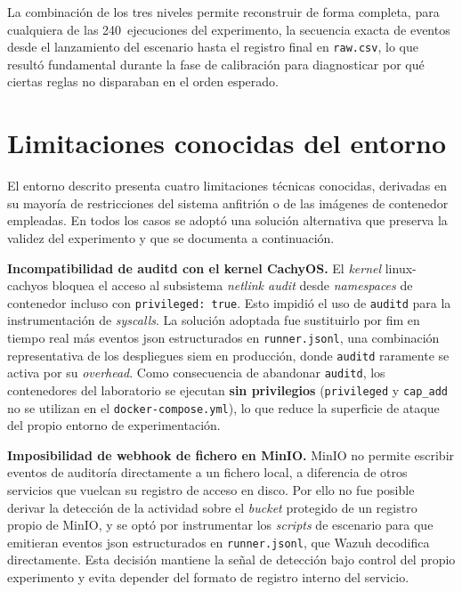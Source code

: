 \documentclass[../main.tex]{subfiles}
\begin{document}
La combinación de los tres niveles permite reconstruir de forma completa, para
cualquiera de las 240~ejecuciones del experimento, la secuencia exacta de
eventos desde el lanzamiento del escenario hasta el registro final en
\texttt{raw.csv}, lo que resultó fundamental durante la fase de calibración
para diagnosticar por qué ciertas reglas no disparaban en el orden esperado.

\section{Limitaciones conocidas del entorno}
\label{sec:limitaciones}

El entorno descrito presenta cuatro limitaciones técnicas conocidas,
derivadas en su mayoría de restricciones del sistema anfitrión o de las
imágenes de contenedor empleadas. En todos los casos se adoptó una solución
alternativa que preserva la validez del experimento y que se documenta a
continuación.

\textbf{Incompatibilidad de auditd con el kernel CachyOS.} El \emph{kernel}
linux-cachyos bloquea el acceso al subsistema \emph{netlink audit} desde
\emph{namespaces} de contenedor incluso con \texttt{privileged:~true}. Esto
impidió el uso de \texttt{auditd} para la instrumentación de \emph{syscalls}.
La solución adoptada fue sustituirlo por \gls{fim} en tiempo real más eventos
\gls{json} estructurados en \texttt{runner.jsonl}, una combinación
representativa de los despliegues \gls{siem} en producción, donde
\texttt{auditd} raramente se activa por su \emph{overhead}. Como consecuencia
de abandonar \texttt{auditd}, los contenedores del laboratorio se ejecutan
\textbf{sin privilegios} (\texttt{privileged} y \texttt{cap\_add} no se
utilizan en el \texttt{docker-compose.yml}), lo que reduce la superficie de
ataque del propio entorno de experimentación.

\textbf{Imposibilidad de webhook de fichero en MinIO.} MinIO no permite
escribir eventos de auditoría directamente a un fichero local, a diferencia
de otros servicios que vuelcan su registro de acceso en disco. Por ello no
fue posible derivar la detección de la actividad sobre el \emph{bucket}
protegido de un registro propio de MinIO, y se optó por instrumentar los
\emph{scripts} de escenario para que emitieran eventos \gls{json}
estructurados en \texttt{runner.jsonl}, que Wazuh decodifica directamente.
Esta decisión mantiene la señal de detección bajo control del propio
experimento y evita depender del formato de registro interno del servicio.
\end{document}
